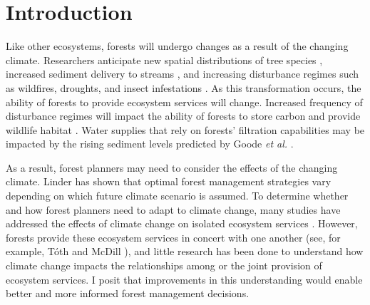 
\section{Introduction}
\label{sec:intro}



Like other ecosystems, forests will undergo changes as a result of the changing climate. Researchers anticipate new spatial distributions of tree species \cite{iverson1998predicting}, increased sediment delivery to streams \cite{Goode20121}, and increasing disturbance regimes such as wildfires, droughts, and insect infestations \cite{vose2012effects}. As this transformation occurs, the ability of forests to provide ecosystem services will change. Increased frequency of disturbance regimes will impact the ability of forests to store carbon \cite{bonan2008forests} and provide wildlife habitat \cite{mckenzie2004climatic}. Water supplies that rely on forests' filtration capabilities may be impacted by the rising sediment levels predicted by Goode \textit{et al.} \cite{Goode20121}.

As a result, forest planners may need to consider the effects of the changing climate. Linder \cite{linder2000developing} has shown that optimal forest management strategies vary depending on which future climate scenario is assumed. To determine whether and how forest planners need to adapt to climate change, many studies have addressed the effects of climate change on isolated ecosystem services \cite{vose2012effects}\cite{bonan2008forests}\cite{mckenzie2004climatic}. However, forests provide these ecosystem services in concert with one another (see, for example, T{\'o}th and McDill \cite{toth2009finding}), and little research has been done to understand how climate change impacts the relationships among or the joint provision of ecosystem services. I posit that improvements in this understanding would enable better and more informed forest management decisions.

